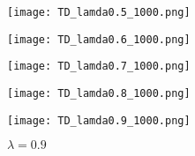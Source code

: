 \documentclass{beamer}
\begin{document}
\begin{frame}
\begin{figure}[ht]
        \begin{minipage}[b]{0.15\linewidth}
        \centering
        \texttt{[image: TD\_lamda0.5\_1000.png]}
        {\caption*{$\lambda = 0.5$}}
        \end{minipage}
        \hspace{0.02 \linewidth}
        \begin{minipage}[b]{0.15\linewidth}
        \centering
        \texttt{[image: TD\_lamda0.6\_1000.png]}
        {\caption*{$\lambda = 0.6$}}
        \end{minipage}
        \hspace{0.02 \linewidth}
        \begin{minipage}[b]{0.15\linewidth}
        \centering
        \texttt{[image: TD\_lamda0.7\_1000.png]}
        {\caption*{$\lambda = 0.7$}}
        \end{minipage}
        \hspace{0.02 \linewidth}
        \begin{minipage}[b]{0.15\linewidth}
        \centering
        \texttt{[image: TD\_lamda0.8\_1000.png]}
        {\caption*{$\lambda = 0.8$}}
        \end{minipage}
        \hspace{0.02 \linewidth}
        \hspace{0.02 \linewidth}
        \begin{minipage}[b]{0.15\linewidth}
        \centering
        \texttt{[image: TD\_lamda0.9\_1000.png]}
        {\caption*{$\lambda = 0.9$}}
        \end{minipage}
        \hspace{0.02 \linewidth}

        \end{figure}
\end{frame}
\end{document}
